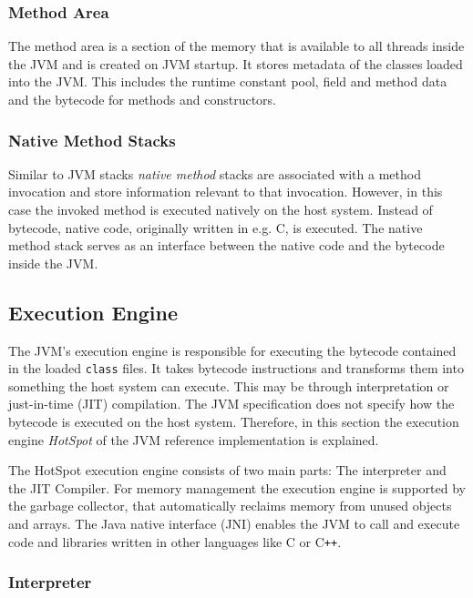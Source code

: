 \subsubsection{Method Area}

The method area is a section of the memory that is available to all threads inside the JVM and is created on JVM startup. It stores metadata of the classes loaded into the JVM. This includes the runtime constant pool, field and method data and the bytecode for methods and constructors.

\subsubsection{Native Method Stacks}

Similar to JVM stacks \textit{native method} stacks are associated with a method invocation and store information relevant to that invocation. However, in this case the invoked method is executed natively on the host system. Instead of bytecode, native code, originally written in e.g. C, is executed. The native method stack serves as an interface between the native code and the bytecode inside the JVM.  
  
\subsection{Execution Engine}

The JVM's execution engine is responsible for executing the bytecode contained in the loaded \texttt{class} files. It takes bytecode instructions and transforms them into something the host system can execute. This may be through interpretation or just-in-time (JIT) compilation. The JVM specification does not specify how the bytecode is executed on the host system. Therefore, in this section the execution engine \textit{HotSpot} of the JVM reference implementation \textcite{OpenJDKHotspotRuntime} is explained.

The HotSpot execution engine consists of two main parts: The interpreter and the JIT Compiler. For memory management the execution engine is supported by the garbage collector, that automatically reclaims memory from unused objects and arrays. The Java native interface (JNI) enables the JVM to call and execute code and libraries written in other languages like C or C\verb|++|.

\subsubsection{Interpreter}

